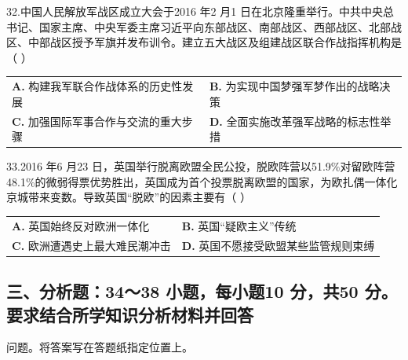 \documentclass[UTF8,11pt]{ctexart}
\begin{document}
32.中国人民解放军战区成立大会于2016 年2 月1 日在北京隆重举行。中共中央总书记、国家主席、中央军委主席习近平向东部战区、南部战区、西部战区、北部战区、中部战区授予军旗并发布训令。建立五大战区及组建战区联合作战指挥机构是（     ）


\begin{center}\begin{tabular}{>{\raggedright\arraybackslash}p{\dimexpr(\linewidth-4\tabcolsep)/2\relax}>{\raggedright\arraybackslash}p{\dimexpr(\linewidth-4\tabcolsep)/2\relax}}
\textbf{A.} 构建我军联合作战体系的历史性发展 & \textbf{B.} 为实现中国梦强军梦作出的战略决策\\[.35em]
\textbf{C.} 加强国际军事合作与交流的重大步骤 & \textbf{D.} 全面实施改革强军战略的标志性举措\\[.35em]\end{tabular}\end{center}

33.2016 年6 月23 日，英国举行脱离欧盟全民公投，脱欧阵营以51.9\%对留欧阵营48.1\%的微弱得票优势胜出，英国成为首个投票脱离欧盟的国家，为欧扎偶一体化京城带来变数。导致英国“脱欧”的因素主要有（     ）


\begin{center}\begin{tabular}{>{\raggedright\arraybackslash}p{\dimexpr(\linewidth-4\tabcolsep)/2\relax}>{\raggedright\arraybackslash}p{\dimexpr(\linewidth-4\tabcolsep)/2\relax}}
\textbf{A.} 英国始终反对欧洲一体化 & \textbf{B.} 英国“疑欧主义”传统\\[.35em]
\textbf{C.} 欧洲遭遇史上最大难民潮冲击 & \textbf{D.} 英国不愿接受欧盟某些监管规则束缚\\[.35em]\end{tabular}\end{center}

\subsection*{三、分析题：34～38 小题，每小题10 分，共50 分。要求结合所学知识分析材料并回答}

问题。将答案写在答题纸指定位置上。
\end{document}
